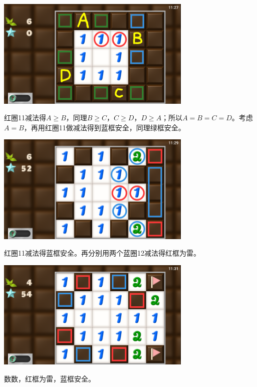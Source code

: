 \subsection{} %
\begin{center}
    \includegraphics[width=0.7\textwidth]{puzzle/15-1.png}
\end{center}
红圈11减法得$A\ge B$，同理$B\ge C$，$C\ge D$，$D\ge A$；所以$A=B=C=D$。考虑$A=B$，再用红圈11做减法得到蓝框安全，同理绿框安全。
\begin{center}
    \includegraphics[width=0.7\textwidth]{puzzle/15-2.png}
\end{center}
红圈11减法得蓝框安全。再分别用两个蓝圈12减法得红框为雷。
\begin{center}
    \includegraphics[width=0.7\textwidth]{puzzle/15-3.png}
\end{center}
数数，红框为雷，蓝框安全。

